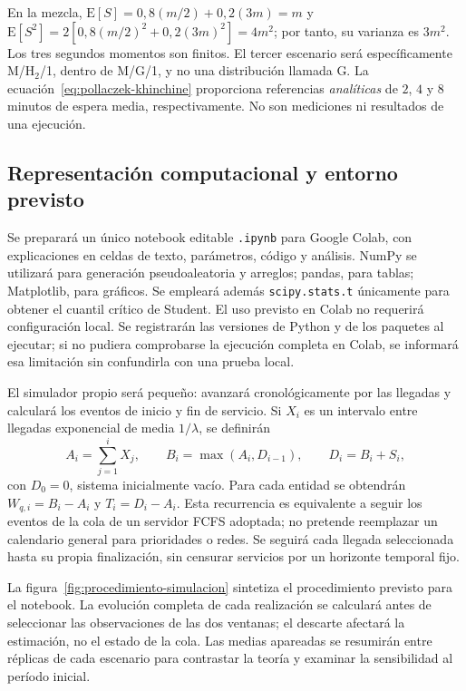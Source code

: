 En la mezcla, $\mathrm{E}[S]=0{,}8(m/2)+0{,}2(3m)=m$ y $\mathrm{E}[S^2]=2[0{,}8(m/2)^2+0{,}2(3m)^2]=4m^2$; por tanto, su varianza es $3m^2$. Los tres segundos momentos son finitos. El tercer escenario será específicamente M/H$_2$/1, dentro de M/G/1, y no una distribución llamada G. La ecuación~\ref{eq:pollaczek-khinchine} proporciona referencias \emph{analíticas} de $2$, $4$ y $8$ minutos de espera media, respectivamente. No son mediciones ni resultados de una ejecución.

\subsection{Representación computacional y entorno previsto}
\label{subsec:metodo-computacion}

Se preparará un único notebook editable \texttt{.ipynb} para Google Colab, con explicaciones en celdas de texto, parámetros, código y análisis. NumPy se utilizará para generación pseudoaleatoria y arreglos; pandas, para tablas; Matplotlib, para gráficos. Se empleará además \texttt{scipy.stats.t} únicamente para obtener el cuantil crítico de Student. El uso previsto en Colab no requerirá configuración local. Se registrarán las versiones de Python y de los paquetes al ejecutar; si no pudiera comprobarse la ejecución completa en Colab, se informará esa limitación sin confundirla con una prueba local.

El simulador propio será pequeño: avanzará cronológicamente por las llegadas y calculará los eventos de inicio y fin de servicio. Si $X_i$ es un intervalo entre llegadas exponencial de media $1/\lambda$, se definirán
\begin{equation}
  A_i=\sum_{j=1}^{i}X_j,\qquad
  B_i=\max(A_i,D_{i-1}),\qquad D_i=B_i+S_i,
  \label{eq:metodo-eventos}
\end{equation}
con $D_0=0$, sistema inicialmente vacío. Para cada entidad se obtendrán $W_{q,i}=B_i-A_i$ y $T_i=D_i-A_i$. Esta recurrencia es equivalente a seguir los eventos de la cola de un servidor FCFS adoptada; no pretende reemplazar un calendario general para prioridades o redes. Se seguirá cada llegada seleccionada hasta su propia finalización, sin censurar servicios por un horizonte temporal fijo.

La figura~\ref{fig:procedimiento-simulacion} sintetiza el procedimiento previsto para el notebook. La evolución completa de cada realización se calculará antes de seleccionar las observaciones de las dos ventanas; el descarte afectará la estimación, no el estado de la cola. Las medias apareadas se resumirán entre réplicas de cada escenario para contrastar la teoría y examinar la sensibilidad al período inicial.

